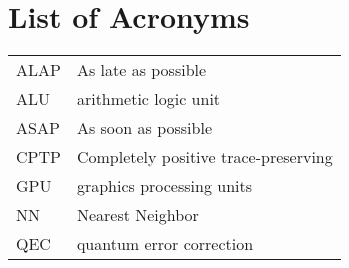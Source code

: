 \chapter*{List of Acronyms}

\begin{table}[ht]
\centering
\begin{tabular}{ll}
ALAP & As late as possible\\
ALU & arithmetic logic unit\\
ASAP & As soon as possible\\
CPTP & Completely positive trace-preserving\\ 
GPU & graphics processing units\\
NN & Nearest Neighbor\\
QEC & quantum error correction\\

\end{tabular}
\end{table}
